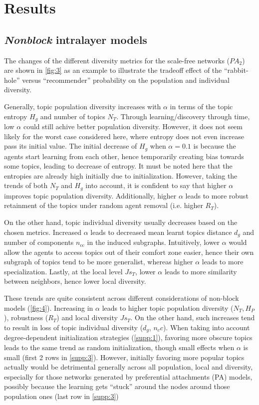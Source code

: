 \section{Results}

\subsection{\textit{Nonblock} intralayer models}




The changes of the different diversity metrics for the scale-free networks ($PA_2$) are shown in \autoref{fig:3} as an example to illustrate the tradeoff effect of the ``rabbit-hole'' versus ``recommender'' probability on the population and individual diversity.

Generally, topic population diversity increases with $\alpha$ in terms of the topic entropy $H_g$ and number of topics $N_T$. Through learning/discovery through time, low $\alpha$ could still achive better population diversity. However, it does not seem likely for the worst case considered here, where entropy does not even increase pass its initial value. The initial decrease of $H_g$ when $\alpha = 0.1$ is because the agents start learning from each other, hence temporarily creating bias towards some topics, leading to decrease of entropy. It must be noted here that the entropies are already high initially due to initialization. However, taking the trends of both $N_T$ and $H_g$ into account, it is confident to say that higher $\alpha$ improves topic population diversity. Additionally, higher $\alpha$ leads to more robust retainment of the topics under random agent removal (i.e. higher $R_T$).

On the other hand, topic individual diversity usually decreases based on the chosen metrics. Increased $\alpha$ leads to decreased mean learnt topics distance $d_g$ and number of components $n_{\mathrm{cc}}$ in the induced subgraphs. Intuitively, lower $\alpha$ would allow the agents to access topics out of their comfort zone easier, hence their own subgraph of topics tend to be more generalist, whereas higher $\alpha$ leads to more specialization. Lastly, at the local level $Js_T$, lower $\alpha$ leads to more similarity between neighbors, hence lower local diversity.

These trends are quite consistent across different considerations of non-block models (\autoref{fig:4}). Increasing in $\alpha$ leads to higher topic population diversity ($N_T, H_P$), robustness ($R_T$) and local diversity $Js_T$. On the other hand, such increases tend to result in loss of topic individual diversity ($d_g$, $n_cc$). When taking into account degree-dependent initialization strategies (\autoref{supp:1}), favoring more obscure topics leads to the same trend as random initialization, though small effects when $\alpha$ is small (first 2 rows in \autoref{supp:3}). However, initially favoring more popular topics actually would be detrimental generally across all population, local and diversity, especially for those networks generated by preferential attachments (PA) models, possibly because the learning gets ``stuck'' around the nodes around those population ones (last row in \autoref{supp:3})

